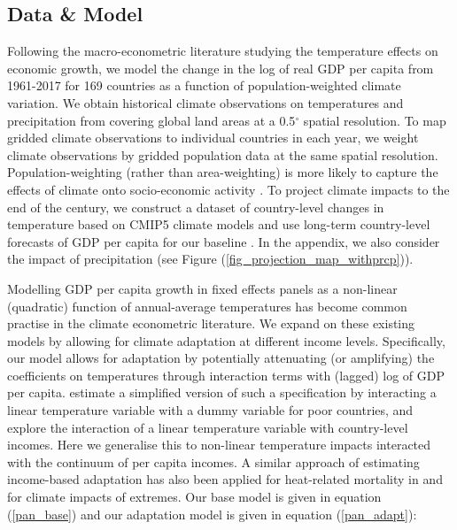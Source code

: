 \documentclass[11pt, letterpaper]{article}
\numberwithin{algorithm}{section}
\numberwithin{assumption}{section}
\numberwithin{lemma}{section}
\numberwithin{theorem}{section}
\numberwithin{corollary}{section}
\numberwithin{remark}{section}
\numberwithin{equation}{section}
\numberwithin{figure}{section}
\numberwithin{table}{section}
\begin{document}
\subsection{Data \& Model}
Following the macro-econometric literature studying the temperature effects on economic growth, we model the change in the log of real GDP per capita \cite[World Development Indicators, ][]{rld2019world} from 1961-2017 for 169 countries as a function of population-weighted climate variation. We obtain historical climate observations on temperatures and precipitation from \citep[][ version 5]{matsuura2018terrestrial} covering global land areas at a 0.5$^\circ$ spatial resolution. To map gridded climate observations to individual countries in each year, we weight climate observations by gridded population data \citep{ciesin2016gridded} at the same spatial resolution. Population-weighting (rather than area-weighting) is more likely to capture the effects of climate onto socio-economic activity \citep[see ][]{tol2017population}. To project climate impacts to the end of the century, we construct a dataset of country-level changes in temperature based on CMIP5 climate models \citep{taylor2012overview} and use long-term country-level forecasts of GDP per capita for our baseline \citep{muller2019econometric}. In the appendix, we also consider the impact of precipitation (see Figure (\ref{fig_projection_map_withprcp})).

Modelling GDP per capita growth in fixed effects panels as a non-linear (quadratic) function of annual-average temperatures has become common practise in the climate econometric literature. We expand on these existing models by allowing for climate adaptation at different income levels. Specifically, our model allows for adaptation by potentially attenuating (or amplifying) the coefficients on temperatures through interaction terms with (lagged) log of GDP per capita. \citet{dell2012temperature} estimate a simplified version of such a specification by interacting a linear temperature variable with a dummy variable for poor countries, and \citet{burke2015global} explore the interaction of a linear temperature variable with country-level incomes. Here we generalise this to non-linear temperature impacts interacted with the continuum of per capita incomes. A similar approach of estimating income-based adaptation has also been applied for heat-related mortality in \citet{carleton2020valuing} and \citet{schwarz2020modelling} for climate impacts of extremes. Our base model is given in equation (\ref{pan_base}) and our adaptation model is given in equation (\ref{pan_adapt}):
\end{document}
